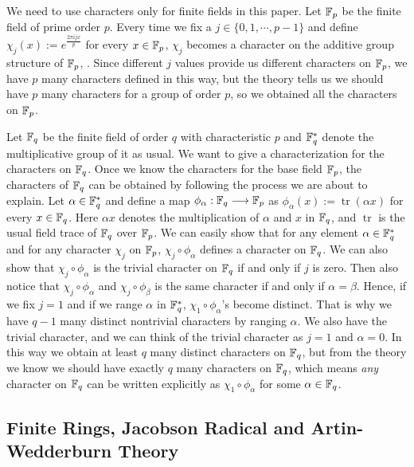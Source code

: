 \documentclass[11pt,reqno]{amsart}
\begin{document}
We need to use characters only for finite fields in this paper. Let $\Bbb F_p$ be the finite field of prime order $p$. Every time we fix a $j \in \{ 0,1, \cdots, p-1 \}$ and define $\chi_{j}(x) := e^{\frac{2\pi ijx}{p}}$ for every $x \in \Bbb F_p$, $\chi_{j}$ becomes a character on the additive group structure of $\Bbb F_p$, \cite{Rosen}. Since different $j$ values provide us different characters on $\Bbb F_p$, we have $p$ many characters defined in this way, but the theory tells us we should have $p$ many characters for a group of order $p$, so we obtained all the characters on $\Bbb F_p$.

Let $\Bbb F_q$ be the finite field of order $q$ with characteristic $p$ and $\Bbb F_q^{\ast}$ denote the multiplicative group of it as usual. We want to give a characterization for the characters on $\Bbb F_q$. Once we know the characters for the base field $\Bbb F_p$, the characters of $\Bbb F_q$ can be obtained by following the process we are about to explain. Let $\alpha \in \Bbb F_q^{\ast}$ and define a map $\phi_{\alpha} : \Bbb F_q \longrightarrow \Bbb F_p$ as $\phi_{\alpha}(x) := \operatorname{tr}(\alpha x)$ for every $x \in \Bbb F_q$. Here $\alpha x$ denotes the multiplication of $\alpha$ and $x$ in $\Bbb F_q$, and $\operatorname{tr}$ is the usual field trace of $\Bbb F_q$ over $\Bbb F_p$. We can easily show that for any element $\alpha \in \Bbb F_q^{\ast}$ and for any character $\chi_{j}$ on $\Bbb F_p$, $\chi_{j} \circ \phi_{\alpha}$ defines a character on $\Bbb F_q$. We can also show that $\chi_{j} \circ \phi_{\alpha}$ is the trivial character on $\Bbb F_q$ if and only if $j$ is zero. Then also notice that $\chi_{j} \circ \phi_{\alpha}$ and $\chi_{j} \circ \phi_{\beta}$ is the same character if and only if $\alpha = \beta$. Hence, if we fix $j=1$ and if we range $\alpha$ in $\Bbb F_q^{\ast}$, $\chi_1 \circ \phi_{\alpha}$'s become distinct. That is why we have $q-1$ many distinct nontrivial characters by ranging $\alpha$. We also have the trivial character, and we can think of the trivial character as $j=1$ and $\alpha=0$. In this way we obtain at least $q$ many distinct characters on $\Bbb F_q$, but from the theory we know we should have exactly $q$ many characters on $\Bbb F_q$, which means \emph{any} character on $\Bbb F_q$ can be written explicitly as $\chi_{1} \circ \phi_{\alpha}$ for some $\alpha \in \Bbb F_q$.

\subsection{Finite Rings, Jacobson Radical and Artin-Wedderburn Theory}
\end{document}
